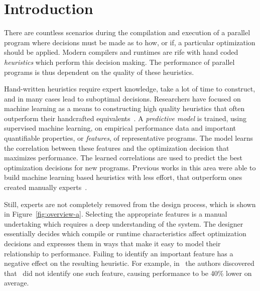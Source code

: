 \section{Introduction}



There are countless scenarios during the compilation and execution of a parallel program where decisions must be made as to how, or if, a particular optimization should be applied. Modern compilers and runtimes are rife with hand coded \emph{heuristics} which perform this decision making. The performance of parallel programs is thus dependent on the quality of these heuristics.

Hand-written heuristics require expert knowledge, take a lot of time to construct, and in many cases lead to suboptimal decisions. Researchers have focused on machine learning as a means to constructing high quality heuristics that often outperform their handcrafted equivalents~\cite{Micolet2016,Falch2015,Stephenson2005,Agakov,Cummins2015a}. A \emph{predictive model} is trained, using supervised machine learning, on empirical performance data and important quantifiable properties, or \emph{features}, of representative programs. The model learns the correlation between these features and the optimization decision that maximizes performance. The learned correlations are used to predict the best optimization decisions for new programs. Previous works in this area were able to build machine learning based heuristics with less effort, that outperform ones created manually experts~\cite{Grewe2013,Magni2014}.

Still, experts are not completely removed from the design process, which is shown in Figure~\ref{fig:overview-a}. Selecting the appropriate features is a manual undertaking which requires a deep understanding of the system. The designer essentially decides which compile or runtime characteristics affect optimization decisions and expresses them in ways that make it easy to model their relationship to performance. Failing to identify an important feature has a negative effect on the resulting heuristic. For example, in~\cite{Cummins2017a} the authors discovered that~\cite{Grewe2013} did not identify one such feature, causing performance to be 40\% lower on average.

